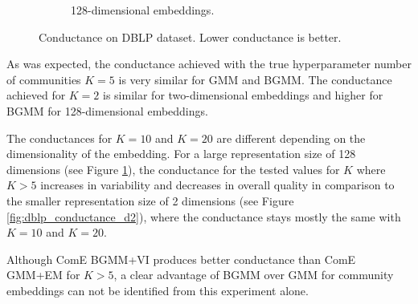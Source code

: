 \documentclass[conference]{IEEEtran}
\begin{document}
\begin{figure}[htbp]
\begin{subfigure}{.5\textwidth}
        \caption{128-dimensional embeddings.}
        \label{fig:dblp_conductance_d128}
    \end{subfigure}

    \caption{Conductance on DBLP dataset. Lower conductance is better.}
    \label{fig:dblp_conductance}
\end{figure}

As was expected, the conductance achieved with the true hyperparameter number of communities $K=5$ is very similar for GMM and BGMM. The conductance achieved for $K=2$ is similar for two-dimensional embeddings and higher for BGMM for 128-dimensional embeddings.

The conductances for $K=10$ and $K=20$ are different depending on the dimensionality of the embedding. For a large representation size of 128 dimensions (see Figure \ref{fig:dblp_conductance_d128}), the conductance for the tested values for $K$ where $K>5$ increases in variability and decreases in overall quality in comparison to the smaller representation size of 2 dimensions (see Figure \ref{fig:dblp_conductance_d2}), where the conductance stays mostly the same with $K=10$ and $K=20$.

Although ComE BGMM+VI produces better conductance than ComE GMM+EM for $K>5$, a clear advantage of BGMM over GMM for community embeddings can not be identified from this experiment alone.
\end{document}
